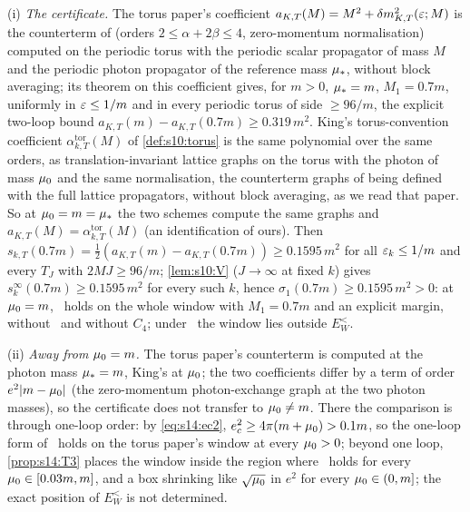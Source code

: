 \begin{remark}[the torus paper's window and its certificate at $\lmu=m$]\label{rem:s14:torus-window}
(i) \emph{The certificate.} The torus paper's coefficient $a_{K,T}(M)=M^2+\delta m^2_{K,T}(\varepsilon;M)$ is the counterterm of \cite[(3.32)--(3.33)]{K1} (orders $2\le\alpha+2\beta\le4$, zero-momentum normalisation) computed on the periodic torus with the periodic scalar propagator of mass $M$ and the periodic photon propagator of the reference mass $\mu_*$, without block averaging; its theorem on this coefficient gives, for $m>0$, $\mu_*=m$, $M_1=0.7m$, uniformly in $\varepsilon\le1/m$ and in every periodic torus of side $\ge96/m$, the explicit two-loop bound $a_{K,T}(m)-a_{K,T}(0.7m)\ge0.319\,m^2$. King's torus-convention coefficient $\alpha^{\mathrm{tor}}_{k,T}(M)$ of \cref{def:s10:torus} is the same polynomial over the same orders, as translation-invariant lattice graphs on the torus with the photon of mass $\mu_0$ and the same normalisation, the counterterm graphs of \cite{K1} being defined with the full lattice propagators, without block averaging, as we read that paper. So at $\mu_0=m=\mu_*$ the two schemes compute the same graphs and $a_{K,T}(M)=\alpha^{\mathrm{tor}}_{k,T}(M)$ (an identification of ours). Then $s_{k,T}(0.7m)=\frac12(a_{K,T}(m)-a_{K,T}(0.7m))\ge0.1595\,m^2$ for all $\varepsilon_k\le1/m$ and every $T_J$ with $2MJ\ge96/m$; \cref{lem:s10:V} ($J\to\infty$ at fixed $k$) gives $s^\infty_k(0.7m)\ge0.1595\,m^2$ for every such $k$, hence $\sigma_1(0.7m)\ge0.1595\,m^2>0$: at $\lmu=m$, \Tthree\ holds on the whole window with $M_1=0.7m$ and an explicit margin, without \sxivCT\ and without $C_4$; under \sxivCT\ the window lies outside $E^<_W$.

(ii) \emph{Away from $\lmu=m$.} The torus paper's counterterm is computed at the photon mass $\mu_*=m$, King's at $\mu_0$; the two coefficients differ by a term of order $e^2|m-\mu_0|$ (the zero-momentum photon-exchange graph at the two photon masses), so the certificate does not transfer to $\mu_0\ne m$. There the comparison is through one-loop order: by \eqref{eq:s14:ec2}, $e_c^2\ge4\pi(m+\mu_0)>0.1m$, so the one-loop form of \Tthree\ holds on the torus paper's window at every $\mu_0>0$; beyond one loop, \cref{prop:s14:T3} places the window inside the region where \Tthree\ holds for every $\mu_0\in[0.03m,m]$, and a box shrinking like $\sqrt{\mu_0}$ in $e^2$ for every $\mu_0\in(0,m]$; the exact position of $E^<_W$ is not determined.
\end{remark}

